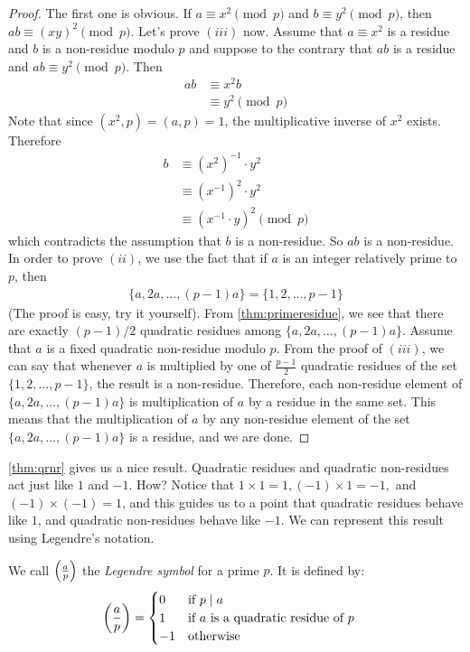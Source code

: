\begin{proof}
	The first one is obvious. If $a \equiv x^2 \pmod p$ and $b\equiv y^2 \pmod p$, then $ab \equiv (xy)^2 \pmod p$.
	Let's prove $(iii)$ now. Assume that $a \equiv x^2$ is a residue and $b$ is a non-residue modulo $p$ and suppose to the contrary that $ab$ is a residue and $ab \equiv y^2 \pmod p$. Then
	\begin{align*}
		ab
			& \equiv x^2b\\
			& \equiv y^2 \pmod p
	\end{align*}
	Note that since $(x^2,p)=(a,p)=1$, the multiplicative inverse of $x^2$ exists. Therefore
	\begin{align*}
		b
			& \equiv (x^2)^{-1} \cdot y^2\\
			& \equiv (x^{-1})^2 \cdot y^2\\
			& \equiv (x^{-1} \cdot y)^2 \pmod p
	\end{align*}
	which contradicts the assumption that $b$ is a non-residue. So $ab$ is a non-residue.
	In order to prove $(ii)$, we use the fact that if $a$ is an integer relatively prime to $p$, then
	\begin{align*}
		\{a,2a,\ldots,(p-1)a\} = \{ 1,2,\ldots,p-1\}
	\end{align*}
	(The proof is easy, try it yourself). From \autoref{thm:primeresidue}, we see that there are exactly   $(p-1)/2$ quadratic residues among $\{a,2a,\ldots,(p-1)a\}$. Assume that $a$ is a fixed quadratic non-residue modulo $p$. From the proof of $(iii)$, we can say that whenever $a$ is multiplied by one of $\displaystyle \frac{p-1}{2}$ quadratic residues of the set $\{ 1,2,\ldots,p-1\}$, the result is a non-residue. Therefore, each non-residue element of $\{a,2a,\ldots,(p-1)a\}$ is multiplication of $a$ by a residue in the same set. This means that the multiplication of $a$ by any non-residue element of the set $\{a,2a,\ldots,(p-1)a\}$ is a residue, and we are done.
\end{proof}

\autoref{thm:qrnr} gives us a nice result. Quadratic residues and quadratic non-residues act just like $1$ and $-1$. How? Notice that $1 \times 1 =1, (-1) \times 1 =-1,$ and $(-1) \times (-1)=1$, and this guides us to a point that quadratic residues behave like $1$, and quadratic non-residues behave like $-1$. %
We can represent this result using Legendre's notation.

\begin{definition}
	We call $\left(\frac{a}{p}\right)$ the \textit{Legendre symbol} for a prime $p$. It is defined by:
	\begin{align*}
		\left(\dfrac{a}{p}\right)
		& =
		\begin{cases}
			0 & \mbox{if }p\mid a\\
			1 &\mbox{if }a\mbox{ is a quadratic residue of }p\\
			-1 &\mbox{otherwise}
		\end{cases}
	\end{align*}

\end{definition}

